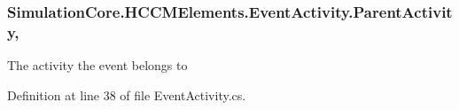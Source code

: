 \subsubsection[{\texorpdfstring{Parent\+Activity}{ParentActivity}}]{ Simulation\+Core.\+H\+C\+C\+M\+Elements.\+Event\+Activity.\+Parent\+Activity\hspace{0.3cm}{\ttfamily [get]}, {\ttfamily [set]}}\hypertarget{class_simulation_core_1_1_h_c_c_m_elements_1_1_event_activity_a70575fed22fd7c33c9d62204ce459ccb}{}\label{class_simulation_core_1_1_h_c_c_m_elements_1_1_event_activity_a70575fed22fd7c33c9d62204ce459ccb}


The activity the event belongs to 



Definition at line 38 of file Event\+Activity.\+cs.

